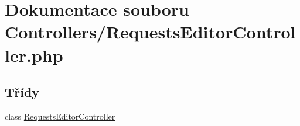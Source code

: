 \hypertarget{_requests_editor_controller_8php}{\section{Dokumentace souboru Controllers/\-Requests\-Editor\-Controller.php}
\label{_requests_editor_controller_8php}
}
\subsection*{Třídy}
\begin{DoxyCompactItemize}
\item 
class \hyperlink{class_requests_editor_controller}{Requests\-Editor\-Controller}
\end{DoxyCompactItemize}
